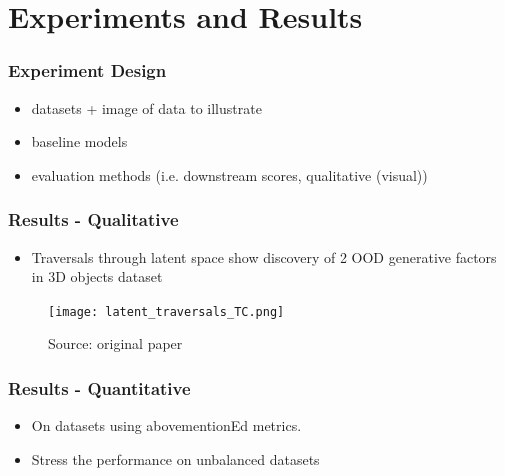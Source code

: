 \documentclass{beamer}
\theoremstyle{definition}
\begin{document}
  \section{Experiments and Results}
    \begin{frame}
      \frametitle{Experiment Design}
      \begin{itemize}
        \item datasets + image of data to illustrate
        \item baseline models
        \item evaluation methods (i.e. downstream scores, qualitative (visual))
      \end{itemize}
    \end{frame}

    \begin{frame}
      \frametitle{Results - Qualitative}
      \begin{itemize}
        \item Traversals through latent space show discovery of 2 OOD generative factors in 3D objects dataset
      \end{itemize}
      \begin{figure}
        \centering
        \texttt{[image: latent\_traversals\_TC.png]}
        \captionsetup{justification=centering}
        \caption*{\tiny{Source: original paper}}

      \end{figure}
    \end{frame}

    \begin{frame}
      \frametitle{Results - Quantitative}
      \begin{itemize}
        \item On datasets using abovementionEd metrics.
        \item Stress the performance on unbalanced datasets
      \end{itemize}
    \end{frame}
\end{document}

